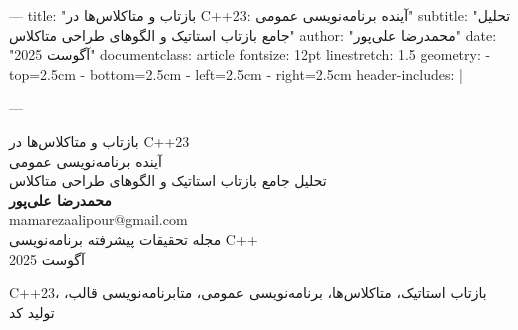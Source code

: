 ---
title: "بازتاب و متاکلاس‌ها در C++23: آینده برنامه‌نویسی عمومی"
subtitle: "تحلیل جامع بازتاب استاتیک و الگوهای طراحی متاکلاس"
author: "محمدرضا علی‌پور"
date: "آگوست 2025"
documentclass: article
fontsize: 12pt
linestretch: 1.5
geometry:
  - top=2.5cm
  - bottom=2.5cm
  - left=2.5cm
  - right=2.5cm
header-includes: |
  \usepackage{fontspec}
  \usepackage{polyglossia}
  \setmainlanguage{persian}
  \newfontfamily{}
  \newfontfamily{}
  \newfontfamily{}
  \setmonofont{Consolas}
  \usepackage{fancyhdr}
  \pagestyle{fancy}
  \fancyhf{}
  \fancyfoot[C]{\thepage}
  \renewcommand{\headrulewidth}{0.4pt}
  \usepackage{xcolor}
  \usepackage{listings}
  \usepackage{tcolorbox}
---

\begin{titlepage}
\centering
{\titlefont\Huge بازتاب و متاکلاس‌ها در C++23}\\[0.5cm]
{\titlefont\LARGE آینده برنامه‌نویسی عمومی}\\[1cm]
{\titlefont\Large تحلیل جامع بازتاب استاتیک و الگوهای طراحی متاکلاس}\\[2cm]

{\Large \textbf{محمدرضا علی‌پور}}\\[0.5cm]
{\large mamarezaalipour@gmail.com}\\[2cm]

{\large مجله تحقیقات پیشرفته برنامه‌نویسی C++}\\[0.5cm]
{\large آگوست 2025}\\[2cm]

\vfill
\end{titlepage}

\newpage

\begin{keywordbox}
C++23، بازتاب استاتیک، متاکلاس‌ها، برنامه‌نویسی عمومی، متابرنامه‌نویسی قالب، تولید کد
\end{keywordbox}

